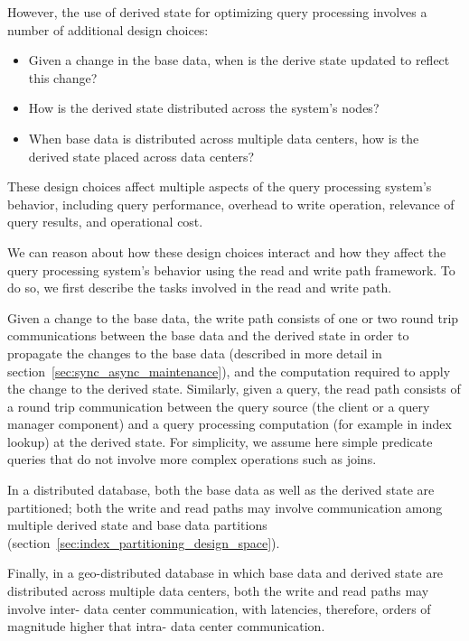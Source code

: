 However, the use of derived state for optimizing query processing involves a number of additional design choices:
\begin{itemize}

  \item Given a change in the base data, when is the derive state updated to reflect this change?

  \item How is the derived state distributed across the system's nodes?

  \item When base data is distributed across multiple data centers, how is the derived state placed across data centers?

\end{itemize}

These design choices affect multiple aspects of the query processing system's behavior,
including query performance, overhead to write operation, relevance of query results, and operational cost.

We can reason about how these design choices interact and how they affect the query processing system's behavior
using the read and write path framework.
To do so, we first describe the tasks involved in the read and write path.

\medskip

Given a change to the base data,
the write path consists of one or two round trip communications between the base data and the derived state
in order to propagate the changes to the base data (described in more detail in section~\ref{sec:sync_async_maintenance}),
and the computation required to apply the change to the derived state.
Similarly, given a query, the read path consists of a round trip communication between the query source (the client or a
query manager component) and a query processing computation (for example in index lookup) at the derived state.
For simplicity, we assume here simple predicate queries that do not involve more complex operations such as joins.

In a distributed database, both the base data as well as the derived state are partitioned;
both the write and read paths may involve communication among multiple derived state and base data
partitions (section~\ref{sec:index_partitioning_design_space}).

Finally, in a geo-distributed database in which base data and derived state are distributed across multiple data centers,
both the write and read paths may involve inter- data center communication, with latencies, therefore, orders of magnitude
higher that intra- data center communication.


